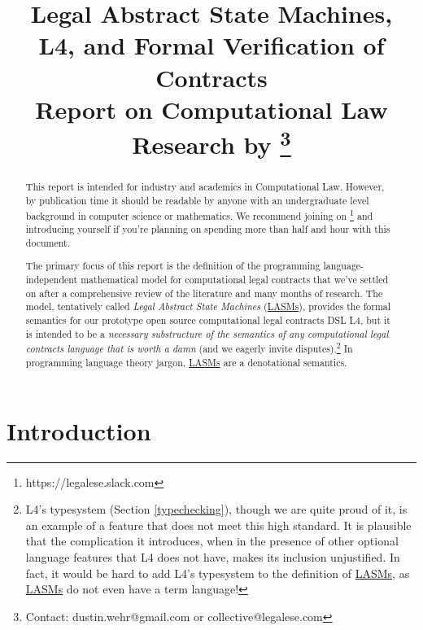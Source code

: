 \documentclass[12pt]{article}
\title{Legal Abstract State Machines, \\
L4, and Formal Verification of Contracts \\
\smaller \smaller Report on Computational Law Research by \extlink{https://legalese.com}{Legalese}\footnote{Contact: dustin.wehr@gmail.com or collective@legalese.com}\larger \larger }
\newcommand{\lasms}{{\sf \hyperref[LASM]{LASMs}}\xspace}
\begin{document}
\maketitle

\begin{abstract}
This report is intended for industry and academics in Computational Law. However, by publication time it should be readable by anyone with an undergraduate level background in computer science or mathematics. We recommend joining  on \footnote{https://legalese.slack.com} and introducing yourself if you're planning on spending more than half and hour with this document. %

The primary focus of this report is the definition of the programming language-independent mathematical model for computational legal contracts that we've settled on after a comprehensive review of the literature and many months of research. The model, tentatively called \textit{Legal Abstract State Machines} (\lasms), provides the formal semantics for our prototype open source computational legal contracts DSL L4, but it is intended to be a \textit{necessary substructure of the semantics of any computational legal contracts language that is worth a damn} (and we eagerly invite disputes).\footnote{L4's typesystem (Section \ref{typechecking}), though we are quite proud of it, is an example of a feature that does not meet this high standard. It is plausible that the complication it introduces, when in the presence of other optional language features that L4 does not have,  makes its inclusion unjustified.
In fact, it would be hard to add L4's typesystem to the definition of \lasms, as \lasms do not even have a term language!} In programming language theory jargon, \lasms are a denotational semantics.
\end{abstract}

\pagebreak

\tableofcontents


\section{Introduction}
\end{document}
